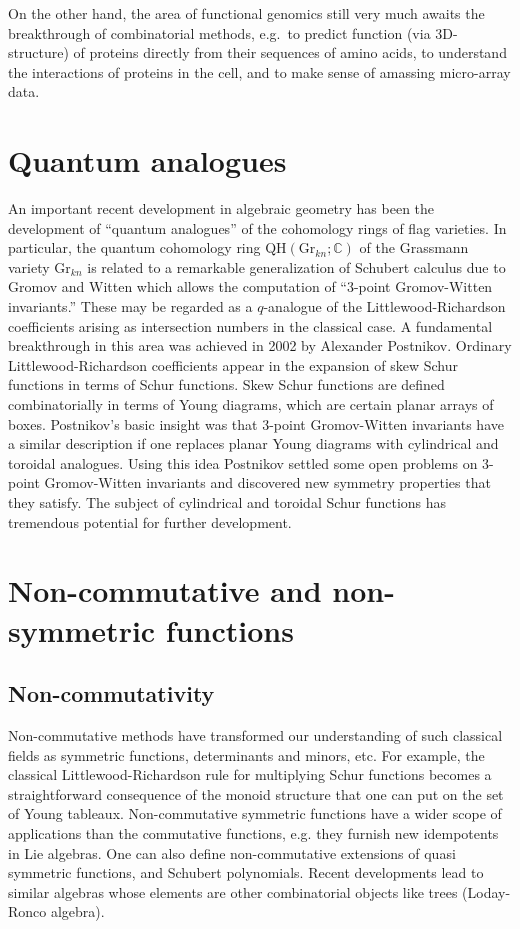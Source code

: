 \documentclass{amsart}
\begin{document}
On the other hand, the area of functional genomics still very much
awaits the breakthrough of combinatorial methods, e.g.~to predict
function (via 3D-structure) of proteins directly from their
sequences of amino acids, to understand the interactions of
proteins in the cell, and to make sense of amassing micro-array data.


\section{Quantum analogues}

An important recent development in algebraic geometry has been the
development of ``quantum analogues'' of the cohomology rings of flag
varieties. In particular, the quantum cohomology ring
QH$(\mathrm{Gr}_{kn}; \mathbb{C})$ of the Grassmann variety Gr$_{kn}$
is related to a remarkable generalization of Schubert calculus due to
Gromov and Witten which allows the computation of ``3-point
Gromov-Witten invariants.'' These may be regarded as a $q$-analogue of
the Littlewood-Richardson coefficients arising as intersection numbers
in the classical case. A fundamental breakthrough in this area was
achieved in 2002 by Alexander Postnikov. Ordinary
Littlewood-Richardson coefficients appear in the expansion of skew
Schur functions in terms of Schur functions. Skew Schur functions are
defined combinatorially in terms of Young diagrams, which are certain
planar arrays of boxes. Postnikov's basic insight was that 3-point
Gromov-Witten invariants have a similar description if one replaces
planar Young diagrams with cylindrical and toroidal analogues. Using
this idea Postnikov settled some open problems on 3-point
Gromov-Witten invariants and discovered new symmetry properties that
they satisfy. The subject of cylindrical and toroidal Schur functions
has tremendous potential for further development.


\section{Non-commutative and non-symmetric functions}
\subsection{Non-commutativity}
Non-commutative methods have transformed our understanding of such
classical fields as symmetric functions, determinants and minors, etc.
For example, the classical Littlewood-Richardson rule for multiplying
Schur functions becomes a straightforward consequence of the monoid
structure that one can put on the set of Young
tableaux. Non-commutative symmetric functions have a wider scope of
applications than the commutative functions, e.g.  they furnish new
idempotents in Lie algebras.  One can also define non-commutative
extensions of quasi symmetric functions, and Schubert polynomials.
Recent developments lead to similar algebras whose elements are other
combinatorial objects like trees (Loday-Ronco algebra).
\end{document}
